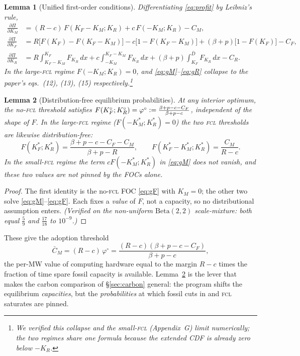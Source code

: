 \documentclass[11pt,reqno]{amsart}
\theoremstyle{plain}
\newtheorem{lemma}{Lemma}
\theoremstyle{definition}
\theoremstyle{remark}
\newcommand{\KR}{K_R}
\newcommand{\KF}{K_F}
\newcommand{\KM}{K_M}
\newcommand{\KRs}{K_R^{*}}
\newcommand{\KFs}{K_F^{*}}
\newcommand{\KMs}{K_M^{*}}
\newcommand{\KRo}{K_R^{\circ}}
\newcommand{\KFo}{K_F^{\circ}}
\newcommand{\Dbar}{\bar D}
\newcommand{\CM}{C_M}
\newcommand{\CF}{C_F}
\newcommand{\CR}{C_R}
\newcommand{\CMbar}{\bar C_M}
\newcommand{\bp}{\beta+p}
\newcommand{\FKR}{F_{\!\KR}}
\newcommand{\eqdef}{\vcentcolon=}
\begin{document}
\begin{lemma}[Unified first-order conditions]\label{lem:foc}
Differentiating \eqref{eq:profit} by Leibniz's rule,
\begin{align}
  \tfrac{\partial\Pi}{\partial\KM}
    &=(R-c)\,F(\KF-\KM;\KR)+c\,F(-\KM;\KR)-\CM,\label{eq:gM}\\[2pt]
  \tfrac{\partial\Pi}{\partial\KF}
    &=R\big[F(\KF)-F(\KF-\KM)\big]-c\big[1-F(\KF-\KM)\big]
      +(\bp)\big[1-F(\KF)\big]-\CF,\label{eq:gF}\\[2pt]
  \tfrac{\partial\Pi}{\partial\KR}
    &=R\!\!\int_{\KF-\KM}^{\KF}\!\!\FKR\,dx
      +c\!\!\int_{-\KM}^{\KF-\KM}\!\!\FKR\,dx
      +(\bp)\!\!\int_{\KF}^{\Dbar}\!\!\FKR\,dx-\CR.\label{eq:gR}
\end{align}
In the large-\textsc{fcl} regime $F(-\KM;\KR)=0$, and \eqref{eq:gM}--\eqref{eq:gR}
collapse to the paper's eqs.\ (12), (13), (15) respectively.\footnote{We verified
this collapse and the small-\textsc{fcl} (Appendix~G) limit numerically; the two
regimes share one formula because the extended CDF is already zero below $-\KR$.}
\end{lemma}

\begin{lemma}[Distribution-free equilibrium probabilities]\label{lem:cutoffs}
At any interior optimum, the no-\textsc{fcl} threshold satisfies
$F(\KFo;\KRo)=\varphi^{\circ}\eqdef\frac{\bp-c-\CF}{\bp-c}$, independent of the
shape of $F$. In the \emph{large-\textsc{fcl}} regime ($F(-\KMs;\KRs)=0$) the two
\textsc{fcl} thresholds are likewise distribution-free:
\begin{equation}\label{eq:cutoffs}
  F(\KFs;\KRs)=\frac{\bp-c-\CF-\CM}{\bp-R},
  \qquad
  F(\KFs-\KMs;\KRs)=\frac{\CM}{R-c}.
\end{equation}
In the small-\textsc{fcl} regime the term $cF(-\KMs;\KRs)$ in \eqref{eq:gM} does
not vanish, and these two values are not pinned by the FOCs alone.
\end{lemma}
\begin{proof}
The first identity is the no-\textsc{fcl} FOC \eqref{eq:gF} with $\KM=0$; the
other two solve \eqref{eq:gM}--\eqref{eq:gF}. Each fixes a \emph{value} of $F$,
not a capacity, so no distributional assumption enters. \emph{(Verified on the
non-uniform $\mathrm{Beta}(2,2)$ scale-mixture: both equal $\tfrac{5}{9}$ and
$\tfrac{17}{18}$ to $10^{-9}$.)}
\end{proof}

\noindent These give the adoption threshold
\begin{equation}\label{eq:cbar}
  \CMbar=(R-c)\,\varphi^{\circ}=\frac{(R-c)(\bp-c-\CF)}{\bp-c},
\end{equation}
the per-MW value of computing hardware equal to the margin $R-c$ times the
fraction of time spare fossil capacity is available. Lemma~\ref{lem:cutoffs} is
the lever that makes the carbon comparison of \S\ref{sec:carbon} general: the
program shifts the equilibrium \emph{capacities}, but the \emph{probabilities}
at which fossil cuts in and \textsc{fcl} saturates are pinned.
\end{document}
